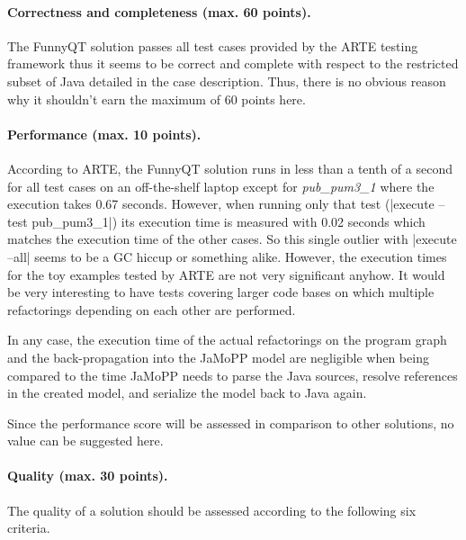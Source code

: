 \documentclass[submission]{eptcs}
\newcommand{\code}{\clojureinline}
\begin{document}
\paragraph{Correctness and completeness (max. 60 points).}

The FunnyQT solution passes all test cases provided by the ARTE testing
framework thus it seems to be correct and complete with respect to the
restricted subset of Java detailed in the case description.  Thus, there is no
obvious reason why it shouldn't earn the maximum of 60 points here.


\paragraph{Performance (max. 10 points).}

According to ARTE, the FunnyQT solution runs in less than a tenth of a second
for all test cases on an off-the-shelf laptop except for \textit{pub\_pum3\_1}
where the execution takes 0.67 seconds.  However, when running only that test
(\code|execute --test pub_pum3_1|) its execution time is measured with 0.02
seconds which matches the execution time of the other cases.  So this single
outlier with \code|execute --all| seems to be a GC hiccup or something alike.
However, the execution times for the toy examples tested by ARTE are not very
significant anyhow.  It would be very interesting to have tests covering larger
code bases on which multiple refactorings depending on each other are
performed.

In any case, the execution time of the actual refactorings on the program graph
and the back-propagation into the JaMoPP model are negligible when being
compared to the time JaMoPP needs to parse the Java sources, resolve references
in the created model, and serialize the model back to Java again.

Since the performance score will be assessed in comparison to other solutions,
no value can be suggested here.


\paragraph{Quality (max. 30 points).}

The quality of a solution should be assessed according to the following six
criteria.
\end{document}
